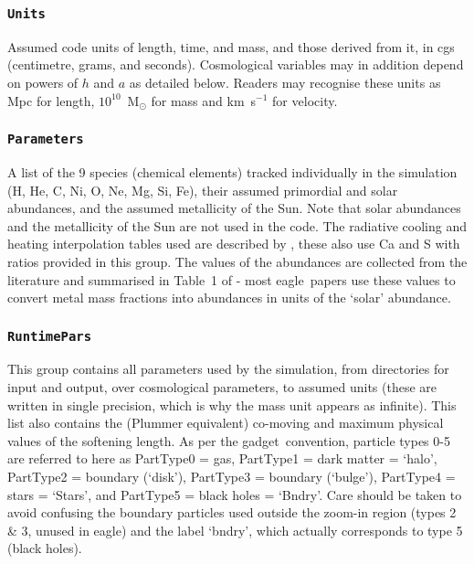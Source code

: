\documentclass[10pt, a4paper]{article}
\newcommand{\eagle}{{\sc eagle}}
\newcommand{\gadget}{{\sc gadget}}
\begin{document}
\subsubsection{\texttt{Units}}

Assumed code units of length, time, and mass, and those derived from it, in cgs (centimetre, grams, and seconds). Cosmological variables may in addition depend on powers of $h$ and $a$ as detailed below. Readers may recognise these units as Mpc for length, $10^{10}$~M$_\odot$ for mass and km~s$^{-1}$ for velocity.

\subsubsection{\texttt{Parameters}}

A list of the 9 species (chemical elements) tracked individually in the simulation (H, He, C, Ni, O, Ne, Mg, Si, Fe), their assumed primordial and solar abundances, and the assumed metallicity of the Sun. Note that solar abundances and the metallicity of the Sun are not used in the code. The radiative cooling and heating interpolation tables used are described by \cite{2009MNRAS.393...99W}, these also use Ca and S with ratios provided in this group. The values of the abundances are collected from the literature and summarised in Table~1 of \cite{2009MNRAS.393...99W} - most \eagle\ papers use these values to convert metal mass fractions into abundances in units of the `solar' abundance.

\subsubsection{\texttt{RuntimePars}}

This group contains all parameters used by the simulation, from directories for input and output, over cosmological parameters, to assumed units (these are written in single precision, which is why the mass unit appears as infinite). This list also contains the (Plummer equivalent) co-moving and maximum physical values of the softening length. As per the \gadget\ convention, particle types 0-5 are referred to here as PartType0 = gas, PartType1 = dark matter = `halo', PartType2 = boundary (`disk'), PartType3 = boundary (`bulge'), PartType4 = stars = `Stars', and PartType5 = black holes = `Bndry'. Care should be taken to avoid confusing the boundary particles used outside the zoom-in region (types 2 \& 3, unused in \eagle) and the label `bndry', which actually corresponds to type 5 (black holes).
\end{document}
